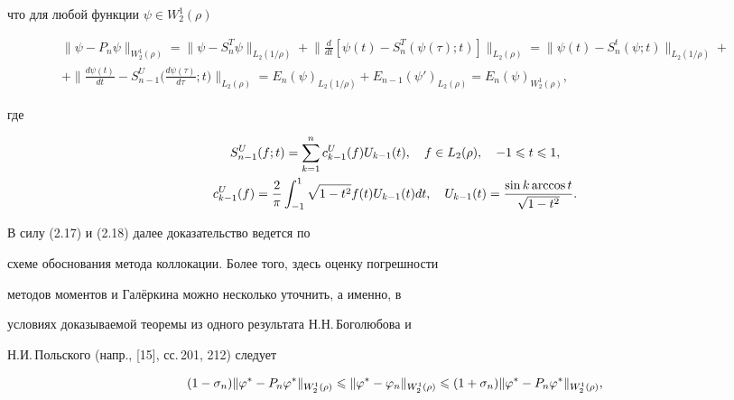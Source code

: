 что для любой функции $\psi\in W_2^1(\rho)$


\begin{multline}


\|\psi - P_n\psi\|_{W_2^1(\rho)} = \|\psi - S_n^T\psi\|_{L_2(1/\rho)} + 


\bigg\|\frac{d}{dt}[\psi(t) -


S_n^T(\psi(\tau);t)]\bigg\|_{L_2(\rho)} =


\|\psi(t)-S^t_n(\psi;t)\|_{L_2(1/\rho)}+ \\


%


+\bigg\|\frac{d\psi(t)}{dt}-S_{n-1}^U


\bigg(\frac{d\psi(\tau)}{d\tau};t\bigg)\bigg\|_{L_2(\rho)}=


E_n(\psi)_{L_2(1/\rho)}+E_{n-1}(\psi')_{L_2(\rho)} = E_n(\psi)_{W_2^1(\rho)},


\end{multline}


где 


\begin{gather*}


S_{n-1}^U (f;t) = \suml_{k=1}^n c_{k-1}^U (f)U_{k-1}(t),


\quad f\in L_2(\rho), \quad -1\lea t \lea 1, \\


%


c_{k-1}^U(f) = \frac{2}{\pi}\int_{-1}^1 \sqrt{1-t^2}f(t)U_{k-1}(t)dt,


\quad U_{k-1}(t)=\frac{\sin k \arccos t}{\sqrt{1-t^2}}.


\end{gather*}


В силу (2.17) и (2.18) далее доказательство ведется по 


схеме обоснования метода коллокации. Более того, здесь оценку погрешности 


методов моментов и Гал\"еркина можно несколько уточнить, а именно, в 


условиях доказываемой теоремы из одного результата Н.Н.\,Боголюбова и


Н.И.\,Польского (напр., [15], сс.\,201, 212) следует


\begin{equation}


(1-\sigma_n)\|\vp^* - P_n\vp^*\|_{W_2^1(\rho)}\lea


\|\vp^* - \vp_n\|_{W_2^1(\rho)} \lea (1+\sigma_n)


\|\vp^* - P_n \vp^*\|_{W_2^1(\rho)},


\end{equation}


